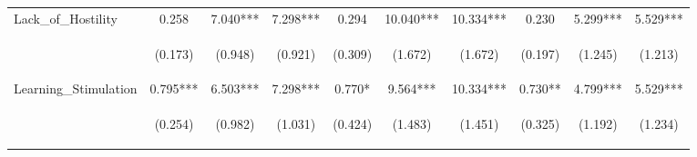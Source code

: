 \begin{tabular}{lccccccccc}
\noalign{\smallskip}Lack_of_Hostility & 0.258 & 7.040*** & 7.298*** & 0.294 & 10.040*** & 10.334*** & 0.230 & 5.299*** & 5.529***\\
 & \begin{footnotesize}(0.173)\end{footnotesize} & \begin{footnotesize}(0.948)\end{footnotesize} & \begin{footnotesize}(0.921)\end{footnotesize} & \begin{footnotesize}(0.309)\end{footnotesize} & \begin{footnotesize}(1.672)\end{footnotesize} & \begin{footnotesize}(1.672)\end{footnotesize} & \begin{footnotesize}(0.197)\end{footnotesize} & \begin{footnotesize}(1.245)\end{footnotesize} & \begin{footnotesize}(1.213)\end{footnotesize}\\
\noalign{\smallskip}Learning_Stimulation & 0.795*** & 6.503*** & 7.298*** & 0.770* & 9.564*** & 10.334*** & 0.730** & 4.799*** & 5.529***\\
 & \begin{footnotesize}(0.254)\end{footnotesize} & \begin{footnotesize}(0.982)\end{footnotesize} & \begin{footnotesize}(1.031)\end{footnotesize} & \begin{footnotesize}(0.424)\end{footnotesize} & \begin{footnotesize}(1.483)\end{footnotesize} & \begin{footnotesize}(1.451)\end{footnotesize} & \begin{footnotesize}(0.325)\end{footnotesize} & \begin{footnotesize}(1.192)\end{footnotesize} & \begin{footnotesize}(1.234)\end{footnotesize}\\

\end{tabular}
